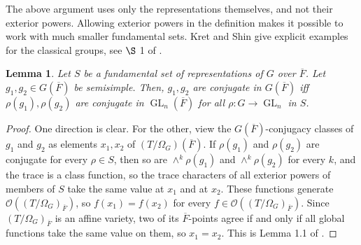 \documentclass[11pt,a4paper]{article}
\theoremstyle{definition}
\theoremstyle{plain}
\newtheorem{Le}[shared]{Lemma}
\theoremstyle{remark}
\theoremstyle{plain}
\DeclareMathOperator{\GL}{GL}
\begin{document}
The above argument uses only the representations themselves, and not their exterior powers. Allowing exterior powers in the definition makes it possible to work with much smaller fundamental sets. Kret and Shin give explicit examples for the classical groups, see $\S$ 1 of \cite{MR4556781}.

\begin{Le}\label{arnolemma}
    Let $S$ be a fundamental set of representations of $G$ over $\overline{F}$. Let $g_1, g_2 \in G(\overline{F})$ be semisimple. Then, $g_1, g_2$ are conjugate in $G(\overline{F})$ iff $\rho(g_1), \rho(g_2)$ are conjugate in $\GL_n(\overline{F})$ for all $\rho: G \xrightarrow[]{} \GL_n$ in $S$.
\end{Le}
\begin{proof}
    One direction is clear. For the other, view the $G(\overline{F})$-conjugacy classes of $g_1$ and $g_2$ as elements $x_1, x_2$ of $(T / \Omega_G)(\overline{F})$. If $\rho(g_1)$ and $\rho(g_2)$ are conjugate for every $\rho \in S$, then so are $\wedge^k \rho(g_1)$ and $\wedge^k \rho(g_2)$ for every $k$, and the trace is a class function, so the trace characters of all exterior powers of members of $S$ take the same value at $x_1$ and at $x_2$. These functions generate $\mathcal{O}((T/\Omega_G)_{\overline{F}})$, so $f(x_1) = f(x_2)$ for every $f \in \mathcal{O}((T/\Omega_G)_{\overline{F}})$. Since $(T/\Omega_G)_{\overline{F}}$ is an affine variety, two of its $\overline{F}$-points agree if and only if all global functions take the same value on them, so $x_1 = x_2$. This is Lemma 1.1 of \cite{MR4556781}.
\end{proof}
\end{document}
